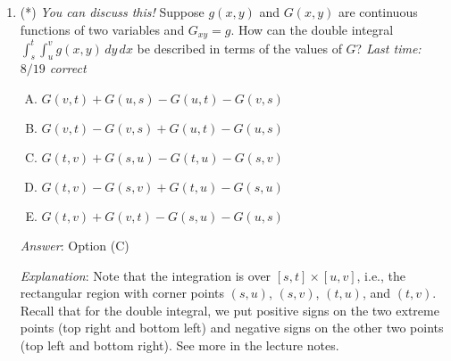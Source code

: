 \documentclass[10pt]{amsart}
\begin{document}
\begin{enumerate}
  \begin{enumerate}[(A)]
  \item A constant times $a^d$
  \item A constant times $a^{d + 1}$
  \item A constant times $a^{d + 2}$
  \item A constant times $a^{2d + 1}$
  \item A constant times $a^{2d + 2}$
  \end{enumerate}

  {\em Answer}: Option (C)

  {\em Explanation}: Each monomial is of the form a constant times
  $x^py^q$ where $p + q = d$. Integrating this as a multiplicatively
  separable function gives $x^{p+1}y^{q+1}$ times a
  constant. Evaluating between limits gives $a^{d + 2}$ times a
  constant. This is the form of the double integral of each monomial,
  and hence the double integral of the sum is also of the same form.

  {\em Performance review}: $14$ out of $24$ people got this. $5$ each
  chose (B) and (E).

  {\em Historical note (last time)}: $12$ out of $19$ people got this
  correct. $3$ people chose (D), $2$ each chose (A) and (E).

\item (*) {\em You can discuss this!} Suppose $g(x,y)$ and $G(x,y)$
  are continuous functions of two variables and $G_{xy} = g$. How can
  the double integral $\int_s^t \int_u^v g(x,y) \, dy \, dx$ be
  described in terms of the values of $G$? {\em Last time: $8/19$
  correct}

  \begin{enumerate}[(A)]
  \item $G(v,t) + G(u,s) - G(u,t) - G(v,s)$
  \item $G(v,t) - G(v,s) + G(u,t) - G(u,s)$
  \item $G(t,v) + G(s,u) - G(t,u) - G(s,v)$
  \item $G(t,v) - G(s,v) + G(t,u) - G(s,u)$
  \item $G(t,v) + G(v,t) - G(s,u) - G(u,s)$
  \end{enumerate}

  {\em Answer}: Option (C)

  {\em Explanation}: Note that the integration is over $[s,t] \times
  [u,v]$, i.e., the rectangular region with corner points $(s,u)$,
  $(s,v)$, $(t,u)$, and $(t,v)$. Recall that for the double integral,
  we put positive signs on the two extreme points (top right and
  bottom left) and negative signs on the other two points (top left
  and bottom right). See more in the lecture notes.


\end{enumerate}
\end{document}
